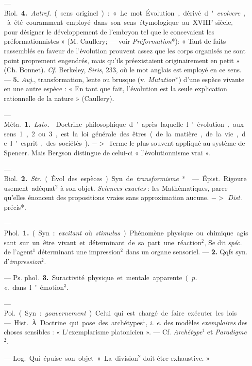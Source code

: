 \begin{itemize}[leftmargin=1cm, label=, itemsep=1pt]
— \si{Biol.} {\bf 4.} {\it Autref.} (sens originel) :
« Le mot Évolution, dérivé d'{\it evolvere}, à été couramment employé
dans son sens étymologique au {\footnotesize XVIII}$^\text{e}$ siècle,
pour désigner le développement de l'embryon tel que le
concevaient les préformationnistes »
(M. Caullery; — voir {\it Préformation}*):
« Tant de faits rassemblés en faveur
de l’évolution prouvent assez que
les corps organisés ne sont point
proprement engendrés, mais qu'ils
préexistaient originairement en
petit » (Ch. Bonnet). {\it Cf.} Berkeley,
{\it Siris}, 233, où le mot anglais est
employé en ce sens. — {\bf 5.} {\it Auj.}, transformation, lente ou brusque (v. {\it Mutation}*) d’une espèce vivante en une
autre espèce : « En tant que fait,
l’évolution est la seule explication
rationnelle de la nature » (Caullery).

 — \si{Méta.}
{\bf 1.} {\it Lato.}  Doctrine philosophique
d’après laquelle l’évolution, aux sens 1, 2 ou 3, est la loi
générale des êtres (de la matière,
de la vie, de l'esprit, des sociétés).
$->$ Terme le plus souvent appliqué
au système de Spencer. Mais Bergson
distingue de celui-ci « l’évolutionnisme vrai ».

— \si{Biol.} {\bf 2.} {\it Str.} (Évol. des espèces)
Syn. de {\it transformisme}*.

 — \si{Épist.} Rigoureusement adéquat$^2$ à son objet.
{\it Sciences exactes} :
les Mathématiques, parce qu'elles
énoncent des propositions vraies sans
approximation aucune. $->$ {\it Dist.}
précis*.

 — \si{Phol.} {\bf 1.} (Syn. : {\it excitant} où
{\it stimulus}). Phénomène physique ou chimique agissant sur un
être vivant et déterminant de sa part
une réaction$^2$, Se dit {\it spéc.} de l’agent$^1$
déterminant une impression$^2$ dans
un organe sensoriel. — {\bf 2.} Qqfs
syn. d’{\it impression}$^2$.

— \si{Ps. phol.} {\bf 3.} Suractivité physique et mentale apparente
({\it p. e.} dans l’émotion$^3$.

 — \si{Pol.} (Syn. : {\it gouvernement}).
Celui qui est chargé de faire exécuter les lois.

 — \si{Hist.} À. Doctrine
qui pose des archétypes$^1$, {\it i. e.} des
modèles {\it exemplaires} des choses sensibles : « L’exemplarisme platonicien ». — Cf. {\it Archétype}$^1$ et {\it Paradigme}$^2$.

 — \si{Log.} Qui épuise son
objet « La division$^2$ doit être exhaustive. »


\end{itemize}
